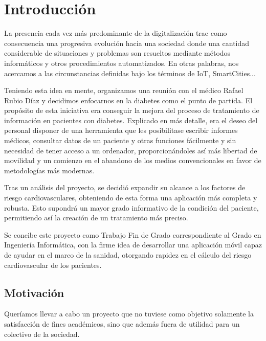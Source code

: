 \documentclass[11pt,spanish,
		listoftables,listoffigures]
		{tfgplantilla}
\begin{document}
\mainmatter


\chapter{Introducci\'on}

La presencia cada vez más predominante de la digitalización trae como consecuencia una progresiva evolución hacia una sociedad donde una cantidad considerable de situaciones y problemas son resueltos mediante métodos informáticos y otros procedimientos automatizados. En otras palabras, nos acercamos a las circunstancias definidas bajo los términos de IoT, SmartCities...

Teniendo esta idea en mente, organizamos una reunión con el médico Rafael Rubio Díaz y decidimos enfocarnos en la diabetes como el punto de partida. El propósito de esta iniciativa era conseguir la mejora del proceso de tratamiento de información en pacientes con diabetes. Explicado en más detalle, era el deseo del personal disponer de una herramienta que les posibilitase escribir informes médicos, consultar datos de un paciente y otras funciones fácilmente y sin necesidad de tener acceso a un ordenador, proporcionándoles así más libertad de movilidad y un comienzo en el abandono de los medios convencionales en favor de metodologías más modernas.

Tras un análisis del proyecto, se decidió expandir su alcance a los factores de riesgo cardiovasculares, obteniendo de esta forma una aplicación más completa y robusta. Esto supondrá un mayor grado informativo de la condición del paciente, permitiendo así la creación de un tratamiento más preciso.

Se concibe este proyecto como Trabajo Fin de Grado correspondiente al Grado en Ingeniería Informática, con la firme idea de desarrollar una aplicación móvil capaz de ayudar en el marco de la sanidad, otorgando rapidez en el cálculo del riesgo cardiovascular de los pacientes.

\section{Motivaci\'on}

Queríamos llevar a cabo un proyecto que no tuviese como objetivo solamente la satisfacción de fines académicos, sino que además fuera de utilidad para un colectivo de la sociedad. 
\end{document}
